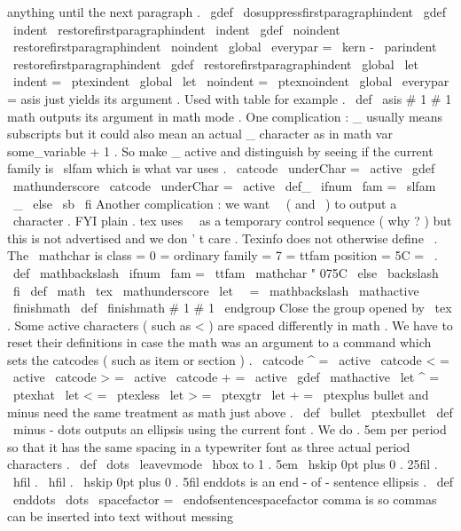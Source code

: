 anything
until
the
next
%
paragraph
.
%
\
gdef
\
dosuppressfirstparagraphindent
{
%
\
gdef
\
indent
{
%
\
restorefirstparagraphindent
\
indent
}
%
\
gdef
\
noindent
{
%
\
restorefirstparagraphindent
\
noindent
}
%
\
global
\
everypar
=
{
%
\
kern
-
\
parindent
\
restorefirstparagraphindent
}
%
}
\
gdef
\
restorefirstparagraphindent
{
%
\
global
\
let
\
indent
=
\
ptexindent
\
global
\
let
\
noindent
=
\
ptexnoindent
\
global
\
everypar
=
{
}
%
}
%
asis
just
yields
its
argument
.
Used
with
table
for
example
.
%
\
def
\
asis
#
1
{
#
1
}
%
math
outputs
its
argument
in
math
mode
.
%
%
One
complication
:
_
usually
means
subscripts
but
it
could
also
mean
%
an
actual
_
character
as
in
math
{
var
{
some_variable
}
+
1
}
.
So
make
%
_
active
and
distinguish
by
seeing
if
the
current
family
is
\
slfam
%
which
is
what
var
uses
.
{
\
catcode
\
underChar
=
\
active
\
gdef
\
mathunderscore
{
%
\
catcode
\
underChar
=
\
active
\
def_
{
\
ifnum
\
fam
=
\
slfam
\
_
\
else
\
sb
\
fi
}
%
}
}
%
Another
complication
:
we
want
\
\
(
and
\
)
to
output
a
\
character
.
%
FYI
plain
.
tex
uses
\
\
as
a
temporary
control
sequence
(
why
?
)
but
%
this
is
not
advertised
and
we
don
'
t
care
.
Texinfo
does
not
%
otherwise
define
\
.
%
%
The
\
mathchar
is
class
=
0
=
ordinary
family
=
7
=
ttfam
position
=
5C
=
\
.
\
def
\
mathbackslash
{
\
ifnum
\
fam
=
\
ttfam
\
mathchar
"
075C
\
else
\
backslash
\
fi
}
%
\
def
\
math
{
%
\
tex
\
mathunderscore
\
let
\
\
=
\
mathbackslash
\
mathactive
\
finishmath
}
\
def
\
finishmath
#
1
{
#
1
\
endgroup
}
%
Close
the
group
opened
by
\
tex
.
%
Some
active
characters
(
such
as
<
)
are
spaced
differently
in
math
.
%
We
have
to
reset
their
definitions
in
case
the
math
was
an
argument
%
to
a
command
which
sets
the
catcodes
(
such
as
item
or
section
)
.
%
{
\
catcode
^
=
\
active
\
catcode
<
=
\
active
\
catcode
>
=
\
active
\
catcode
+
=
\
active
\
gdef
\
mathactive
{
%
\
let
^
=
\
ptexhat
\
let
<
=
\
ptexless
\
let
>
=
\
ptexgtr
\
let
+
=
\
ptexplus
}
}
%
bullet
and
minus
need
the
same
treatment
as
math
just
above
.
\
def
\
bullet
{
\
ptexbullet
}
\
def
\
minus
{
-
}
%
dots
{
}
outputs
an
ellipsis
using
the
current
font
.
%
We
do
.
5em
per
period
so
that
it
has
the
same
spacing
in
a
typewriter
%
font
as
three
actual
period
characters
.
%
\
def
\
dots
{
%
\
leavevmode
\
hbox
to
1
.
5em
{
%
\
hskip
0pt
plus
0
.
25fil
.
\
hfil
.
\
hfil
.
%
\
hskip
0pt
plus
0
.
5fil
}
%
}
%
enddots
{
}
is
an
end
-
of
-
sentence
ellipsis
.
%
\
def
\
enddots
{
%
\
dots
\
spacefactor
=
\
endofsentencespacefactor
}
%
comma
{
}
is
so
commas
can
be
inserted
into
text
without
messing
